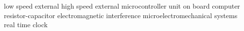      {low speed external}
     {high speed external}
     {microcontroller unit}
     {on board computer}
      {resistor-capacitor}
     {electromagnetic interference}
    {microelectromechanical systems}
     {real time clock}
